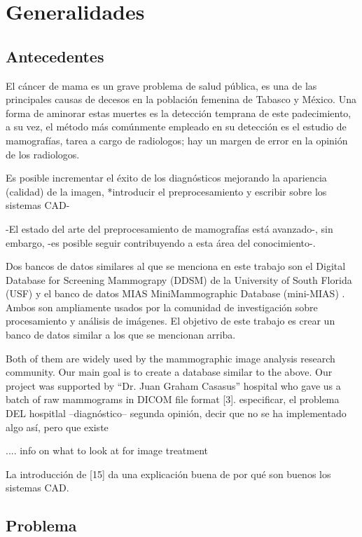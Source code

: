 \chapter{Generalidades}

\section{Antecedentes}

El cáncer de mama es un grave problema de salud pública, es una de las
principales causas de decesos en la población femenina de Tabasco y México. Una 
forma de aminorar estas muertes es la detección temprana de este padecimiento, a
su vez, el método más comúnmente empleado en su detección es el estudio de
mamografías, tarea a cargo de radiologos; hay un margen de error en la opinión
de los radiologos.

Es posible incrementar el éxito de los diagnósticos mejorando la apariencia
(calidad) de la imagen, *introducir el preprocesamiento y escribir sobre los
sistemas CAD-

-El estado del arte del preprocesamiento de mamografías está avanzado-, sin embargo,
-es posible seguir contribuyendo a esta área del conocimiento-. 

Dos bancos de datos similares al que se menciona en este trabajo son el Digital
Database for Screening Mammograpy (DDSM) de la University of South Florida
(USF) \cite{heath2000digital} y el banco de datos MIAS MiniMammographic
Database (mini-MIAS) \cite{sucklingmini}. Ambos son ampliamente usados por la
comunidad de investigación sobre procesamiento y análisis de imágenes. El
objetivo de este trabajo es crear un banco de datos similar a los que se
mencionan arriba. 

Both of them are widely used by the mammographic image analysis research
community.  Our main goal is to create a database similar to the above.  Our
project was supported by “Dr. Juan Graham Casasus” hospital who gave us a batch
of raw mammograms in DICOM file format [3].  especificar, el problema DEL
hospitlal --diagnóstico-- segunda opinión, decir que no se ha implementado algo
así, pero que existe
 
.... info on what to look at for image treatment 

La introducción de [15] da una explicación buena de por qué son buenos los
sistemas CAD.

\section{Problema}
